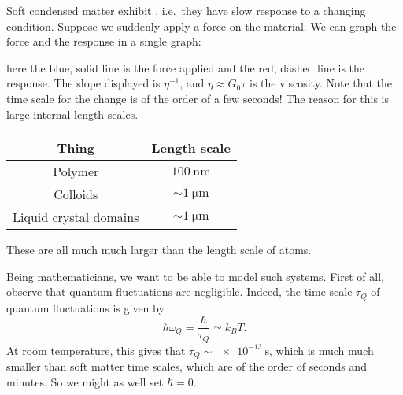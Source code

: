 \documentclass[a4paper]{article}
\begin{document}
Soft condensed matter exhibit , i.e.\ they have slow response to a changing condition. Suppose we suddenly apply a force on the material. We can graph the force and the response in a single graph:
\begin{center}
\end{center}
here the blue, solid line is the force applied and the red, dashed line is the response. The slope displayed is $\eta^{-1}$, and $\eta \approx G_0 \tau$ is the viscosity. Note that the time scale for the change is of the order of a few seconds! The reason for this is large internal length scales.
\begin{center}
  \begin{tabular}{cc}
    \toprule
    \textbf{Thing} & \textbf{Length scale} \\
    \midrule
    Polymer & $\SI{100}{\nano\meter}$\\
    Colloids & $\sim\SI{1}{\micro\meter}$\\
    Liquid crystal domains & $\sim\SI{1}{\micro\meter}$\\
    \bottomrule
  \end{tabular}
\end{center}
These are all much much larger than the length scale of atoms.

Being mathematicians, we want to be able to model such systems. First of all, observe that quantum fluctuations are negligible. Indeed, the time scale $\tau_Q$ of quantum fluctuations is given by
\[
  \hbar \omega_Q = \frac{\hbar}{\tau_Q} \simeq k_B T.
\]
At room temperature, this gives that $\tau_Q\sim \SI{e-13}{\second}$, which is much much smaller than soft matter time scales, which are of the order of seconds and minutes. So we might as well set $\hbar = 0$.
\end{document}
